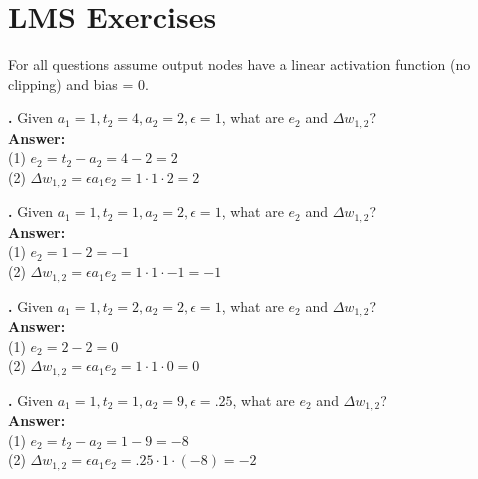 \newpage

\section{LMS Exercises}


For all questions assume output nodes have a linear activation function (no clipping) and bias = 0.


\noindent
{}
{\bf \theLMSCounter.}  Given $a_1 = 1, t_2 = 4, a_2 = 2, \epsilon = 1$, what are $e_2$ and $\Delta w_{1,2}$? \\
{\bf Answer:}  \\
(1) $e_2 = t_2 - a_2 = 4 - 2  = 2 $ \\
(2) $\Delta w_{1,2} = \epsilon a_1 e_2 = 1 \cdot 1 \cdot  2 = 2$
\bigskip

\noindent
{}
{\bf \theLMSCounter.}  Given $a_1 = 1, t_2 = 1, a_2 = 2, \epsilon = 1$, what are $e_2$ and $\Delta w_{1,2}$? \\
{\bf Answer:}  \\
(1) $e_2 = 1 - 2  = -1 $ \\
(2) $\Delta w_{1,2} = \epsilon a_1 e_2 = 1 \cdot 1 \cdot  -1 = -1$
\bigskip

\noindent
{}
{\bf \theLMSCounter.}  Given $a_1 = 1, t_2 = 2, a_2 = 2, \epsilon = 1$, what are $e_2$ and $\Delta w_{1,2}$? \\
{\bf Answer:}  \\
(1) $e_2 = 2 - 2  = 0 $ \\
(2) $\Delta w_{1,2} = \epsilon a_1 e_2 = 1 \cdot 1 \cdot 0 = 0$
\bigskip

\noindent
{}
{\bf \theLMSCounter.}  Given $a_1 = 1, t_2 = 1, a_2 = 9, \epsilon = .25$, what are $e_2$ and $\Delta w_{1,2}$? \\
{\bf Answer:}  \\
(1) $e_2 = t_2 - a_2 = 1 - 9 = -8 $ \\
(2) $\Delta w_{1,2} = \epsilon a_1 e_2 =  .25 \cdot 1 \cdot (-8)  = -2$
\bigskip





